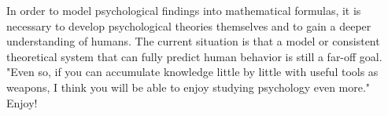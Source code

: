 \documentclass{ltjsbook}
\begin{document}
In order to model psychological findings into mathematical formulas, it is necessary to develop psychological theories themselves and to gain a deeper understanding of humans.
The current situation is that a model or consistent theoretical system that can fully predict human behavior is still a far-off goal.
"Even so, if you can accumulate knowledge little by little with useful tools as weapons, I think you will be able to enjoy studying psychology even more." Enjoy!
\end{document}
